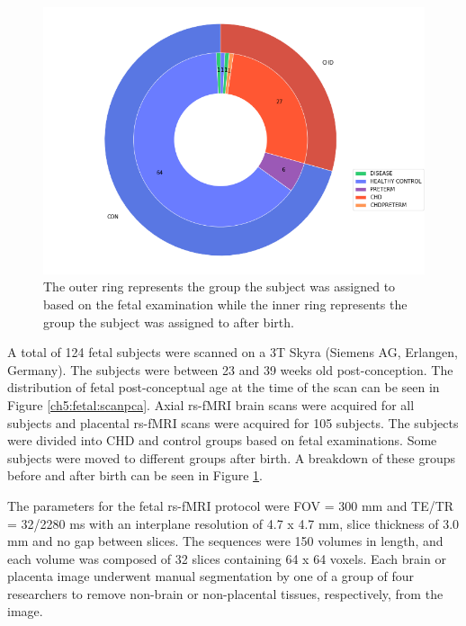 \begin{figure}
\centering
\includegraphics[width=.9\textwidth]{5/demo_fetal_subj_cohort.png}
\caption{The outer ring represents the group the subject was assigned to based on the fetal examination while the inner ring represents the group the subject was assigned to after birth.}
\label{ch5:fetal:cohort}
\end{figure}

A total of 124 fetal subjects were scanned on a 3T Skyra (Siemens AG, Erlangen, Germany). The subjects were between 23 and 39 weeks old post-conception. The distribution of fetal post-conceptual age at the time of the scan can be seen in Figure \ref{ch5:fetal:scanpca}. Axial rs-fMRI brain scans were acquired for all subjects and placental rs-fMRI scans were acquired for 105 subjects. The subjects were divided into CHD and control groups based on fetal examinations. Some subjects were moved to different groups after birth. A breakdown of these groups before and after birth can be seen in Figure \ref{ch5:fetal:cohort}.

The parameters for the fetal rs-fMRI protocol were FOV = 300 mm and TE/TR = 32/2280 ms with an interplane resolution of 4.7 x 4.7 mm, slice thickness of 3.0 mm and no gap between slices. The sequences were 150 volumes in length, and each volume was composed of 32 slices containing 64 x 64 voxels. Each brain or placenta image underwent manual segmentation by one of a group of four researchers to remove non-brain or non-placental tissues, respectively, from the image. 



